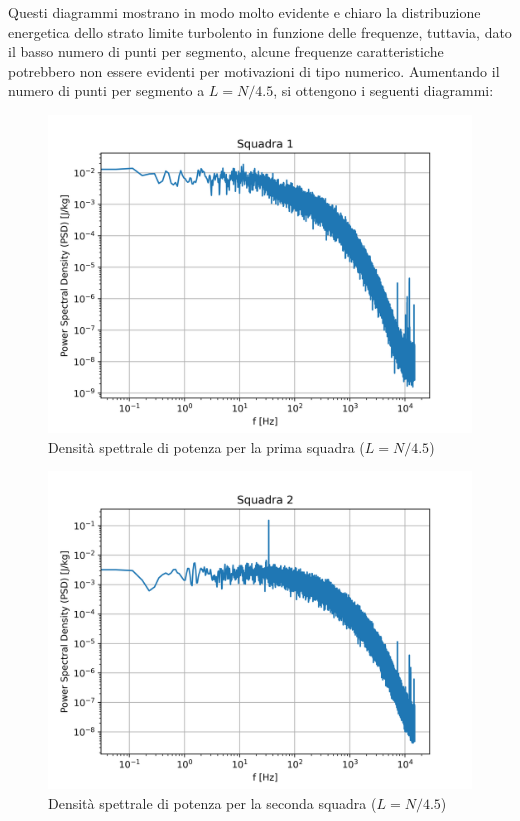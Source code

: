 \noindent Questi diagrammi mostrano in modo molto evidente e chiaro la distribuzione energetica dello strato limite turbolento in funzione delle frequenze, tuttavia, dato il basso numero di punti per segmento, alcune frequenze caratteristiche potrebbero non essere evidenti per motivazioni di tipo numerico. Aumentando il numero di punti per segmento a $L=N/4.5$, si ottengono i seguenti diagrammi:

\begin{figure}[H]
    \centering
    \includegraphics[width=.73\textwidth]{images/9/sq1timeserieswelch.png}
    \caption{Densità spettrale di potenza per la prima squadra ($L=N/4.5$)}
\end{figure}

\begin{figure}[H]
    \centering
    \includegraphics[width=.84\textwidth]{images/9/sq2timeserieswelch.png}
    \caption{Densità spettrale di potenza per la seconda squadra ($L=N/4.5$)}
\end{figure}

